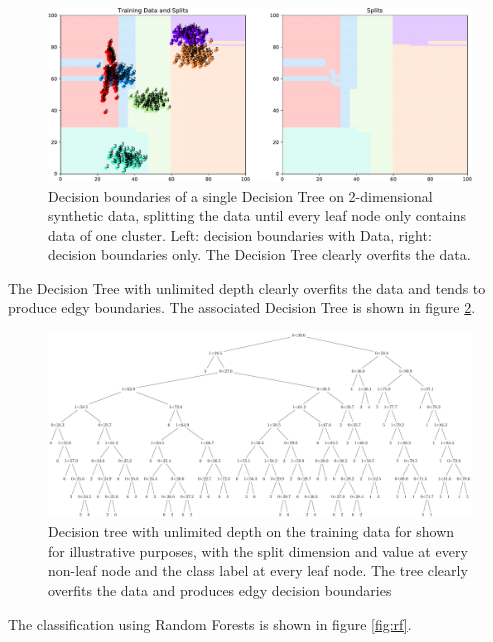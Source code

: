 \documentclass[10pt]{article}
\begin{document}
\begin{figure}[H]
    \centering
    \includegraphics[width=\textwidth]{decision_boundaries}
    \caption{Decision boundaries of a single Decision Tree on 2-dimensional synthetic data, splitting the data until every leaf node only contains data of one cluster. Left: decision boundaries with Data, right: decision boundaries only. The Decision Tree clearly overfits the data.}
    \label{fig:decision-boundaries}
\end{figure}
The Decision Tree with unlimited depth clearly overfits the data and tends to produce edgy boundaries. The associated Decision Tree is shown in figure \ref{fig:decision_tree}.

\begin{figure}[H]
    \centering
    \includegraphics[width=\textwidth]{decision_tree}
    \caption{Decision tree with unlimited depth on the training data for shown for illustrative purposes, with the split dimension and value at every non-leaf node and the class label at every leaf node. The tree clearly overfits the data and produces edgy decision boundaries}
    \label{fig:decision_tree}
\end{figure}
The classification using Random Forests is shown in figure \ref{fig:rf}.
\end{document}
